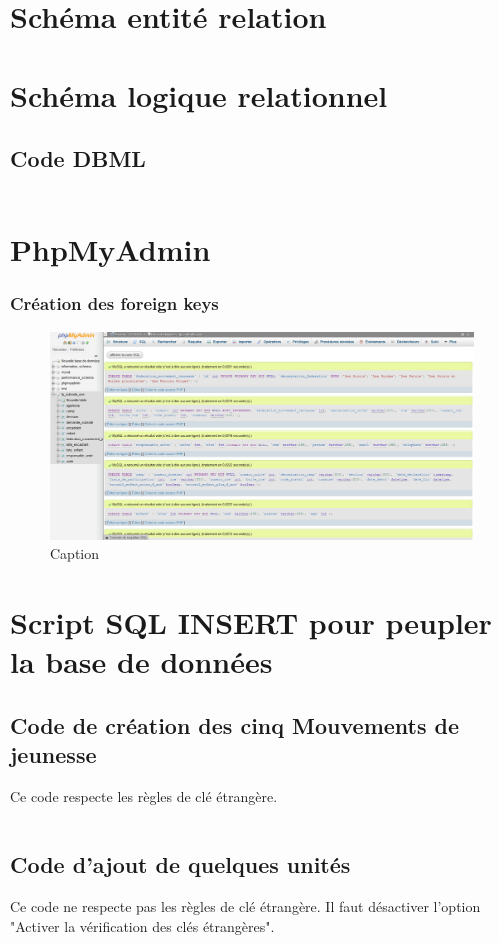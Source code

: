 \section{Schéma entité relation}

\section{Schéma logique relationnel}
\subsection{Code DBML}
\inputminted[breaklines =true, autogobble, linenos, frame = single]{sql}{Codes/code_dbml.tex}


\section{PhpMyAdmin}
\subsubsection{Création des foreign keys}
\begin{figure}[H]
    \centering
    \includegraphics[width=15cm]{Appendix/phpmyadmin_creation_table.png}
    \caption{Caption}
    \label{fig:pmy_creation_fk}
\end{figure}


\section{Script SQL INSERT pour peupler la base de données}

\subsection{Code de création des cinq Mouvements de jeunesse}

Ce code respecte les règles de clé étrangère.
\inputminted[breaklines =true, autogobble, linenos, frame = single]{sql}{Codes/code_insert_fmj.tex}


\subsection{Code d'ajout de quelques unités}
Ce code ne respecte pas les règles de clé étrangère. Il faut désactiver l'option "Activer la vérification des clés étrangères".
\inputminted[breaklines =true, autogobble, linenos, frame = single]{sql}{Codes/code_insert_unite.tex}
